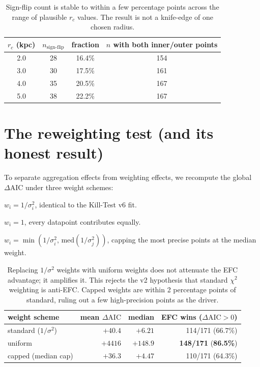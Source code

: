 \documentclass[11pt,a4paper]{article}
\begin{document}
\begin{table}[h]
\centering
\small
\begin{tabular}{cccc}
\toprule
$r_c$ (kpc) & $n_{\text{sign-flip}}$ & fraction & $n$ with both inner/outer points \\
\midrule
2.0 & 28 & 16.4\% & 154 \\
3.0 & 30 & 17.5\% & 161 \\
4.0 & 35 & 20.5\% & 167 \\
5.0 & 38 & 22.2\% & 167 \\
\bottomrule
\end{tabular}
\caption{Sign-flip count is stable to within a few percentage points
across the range of plausible $r_c$ values.  The result is not a
knife-edge of one chosen radius.}
\label{tab:rc}
\end{table}

\section{The reweighting test (and its honest result)}
\label{sec:reweight}

To separate aggregation effects from weighting effects, we recompute
the global $\Delta\text{AIC}$ under three weight schemes:
\begin{description}[leftmargin=2em]
  \item[Standard] $w_i=1/\sigma_i^2$, identical to the Kill-Test v6 fit.
  \item[Uniform]  $w_i=1$, every datapoint contributes equally.
  \item[Capped]   $w_i=\min(1/\sigma_i^2,\,\text{med}(1/\sigma_j^2))$,
                  capping the most precise points at the median weight.
\end{description}

\begin{table}[h]
\centering
\small
\begin{tabular}{lrrr}
\toprule
weight scheme & mean $\Delta\text{AIC}$ & median & EFC wins ($\Delta\text{AIC}>0$) \\
\midrule
standard ($1/\sigma^2$) & $+40.4$  & $+6.21$  & 114/171 (66.7\%) \\
uniform                 & $+4416$  & $+148.9$ & \textbf{148/171} (\textbf{86.5\%}) \\
capped (median cap)     & $+36.3$  & $+4.47$  & 110/171 (64.3\%) \\
\bottomrule
\end{tabular}
\caption{Replacing $1/\sigma^2$ weights with uniform weights does not
attenuate the EFC advantage; it amplifies it.  This rejects the v2
hypothesis that standard $\chi^2$ weighting is anti-EFC.  Capped weights
are within 2 percentage points of standard, ruling out a few
high-precision points as the driver.}
\label{tab:reweight}
\end{table}
\end{document}
